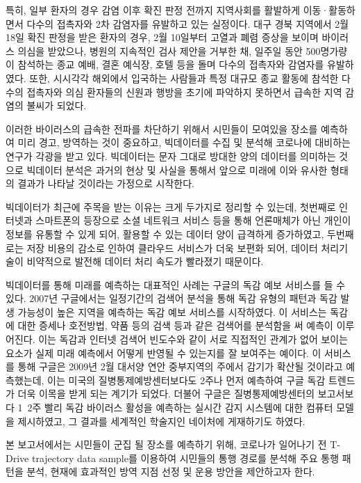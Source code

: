 \documentclass[10pt,journal,compsoc]{IEEEtran}
\begin{document}
특히, 일부 환자의 경우 감염 이후 확진 판정 전까지 지역사회를 활발하게 이동·활동하면서 다수의 접촉자와 2차 감염자를 유발하고 있는 실정이다. 대구 경북 지역에서 2월 18일 확진 판정을 받은 환자의 경우, 2월 10일부터 고열과 폐렴 증상을 보이며 바이러스 의심을 받았으나, 병원의 지속적인 검사 제안을 거부한 채, 일주일 동안 500명가량이 참석하는 종교 예배, 결혼 예식장, 호텔 등을 돌며 다수의 접촉자와 감염자를 유발하였다. 또한, 시시각각 해외에서 입국하는 사람들과 특정 대규모 종교 활동에 참석한 다수의 접촉자와 의심 환자들의 신원과 행방을 초기에 파악하지 못하면서 급속한 지역 감염의 불씨가 되었다.

이러한 바이러스의 급속한 전파를 차단하기 위해서 시민들이 모여있을 장소를 예측하여 미리 경고, 방역하는 것이 중요하고, 빅데이터를 수집 및 분석해 코로나에 대비하는 연구가 각광을 받고 있다. 빅데이터는 문자 그대로 방대한 양의 데이터를 의미하는 것으로 빅데이터 분석은 과거의 현상 및 사실을 통해서 앞으로 미래에 이와 유사한 형태의 결과가 나타날 것이라는 가정으로 시작한다.

 빅데이터가 최근에 주목을 받는 이유는 크게 두가지로 정리할 수 있는데, 첫번째로 인터넷과 스마트폰의 등장으로 소셜 네트워크 서비스 등을 통해 언론매체가 아닌 개인이 정보를 유통할 수 있게 되어, 활용할 수 있는 데이터 양이 급격하게 증가하였고, 두번째로는 저장 비용의 감소로 인하여 클라우드 서비스가 더욱 보편화 되어, 데이터 처리기술이 비약적으로 발전해 데이터 처리 속도가 빨라졌기 때문이다.
 
 빅데이터를 통해 미래를 예측하는 대표적인 사례는 구글의 독감 예보 서비스를 들 수 있다. 2007년 구글에서는 일정기간의 검색어 분석을 통해 독감 유형의 패턴과 독감 발생 가능성이 높은 지역을 예측하는 독감 예보 서비스를 시작하였다. 이 서비스는 독감에 대한 증세나 호전방법, 약품 등의 검색 등과 같은 검색어를 분석함을 써 예측이 이루어진다. 이는 독감과 인터넷 검색어 빈도수와 같이 서로 직접적인 관계가 없어 보이는 요소가 실제 미래 예측에서 어떻게 반영될 수 있는지를 잘 보여주는 예이다. 이 서비스를 통해 구글은 2009년 2월 대서양 연안 중부지역의 주에서 감기가 확산될 것이라고 예측했는데, 이는 미국의 질병통제예방센터보다도 2주나 먼저 예측하여 구글 독감 트렌드가 더욱 이목을 받게 되는 계기가 되었다. 더불어 구글은 질병통제예방센터의 보고서보다 1~2주 빨리 독감 바이러스 활성을 예측하는 실시간 감지 시스템에 대한 컴퓨터 모델을 제시하였고, 그 결과를 세계적인 학술지인 네이처에 게재하기도 하였다.
 
본 보고서에서는 시민들이 군집 될 장소를 예측하기 위해, 코로나가 일어나기 전 T-Drive trajectory data sample를 이용하여 시민들의 통행 경로를 분석해 주요 통행 패턴을 분석, 현재에 효과적인 방역 지점 선정 및 운용 방안을 제안하고자 한다.
\end{document}
